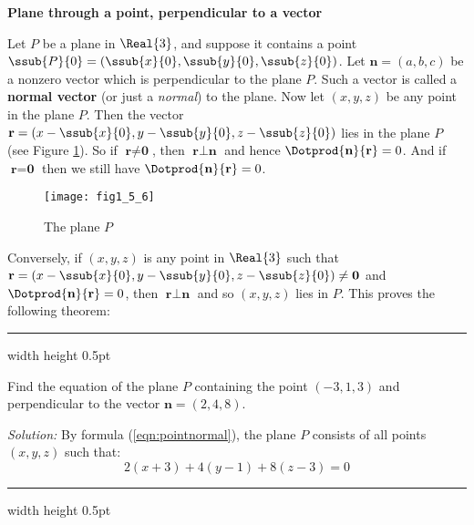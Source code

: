\par\noindent\textbf{\large{Plane through a point, perpendicular to a vector}}\normalsize\vspace{1.5mm}

Let $P$ be a plane in $\Real{3}$, and suppose it contains a point
$\ssub{P}{0} = (\ssub{x}{0},\ssub{y}{0},\ssub{z}{0})$. Let $\textbf{n} = (a,b,c)$ be a nonzero vector which is
perpendicular to the plane $P$. Such a vector is called a \textbf{normal vector} (or just a \emph{normal}) to the plane.
 Now let $(x,y,z)$ be any point in the plane $P$. Then the vector
$\textbf{r} = (x - \ssub{x}{0},y - \ssub{y}{0},z - \ssub{z}{0})$ lies in the plane $P$ (see Figure \ref{fig:planenorm}).
So if $\textbf{r} \ne \textbf{0}$, then $\textbf{r} \perp \textbf{n}$ and hence $\Dotprod{\textbf{n}}{\textbf{r}} = 0$.
And if $\textbf{r} = \textbf{0}$ then we still have $\Dotprod{\textbf{n}}{\textbf{r}} = 0$.

\begin{figure}[h]
 \begin{center}
  \texttt{[image: fig1\_5\_6]}
 \end{center}\vspace{-5mm}
 \caption[]{\quad The plane $P$}
 \label{fig:planenorm}
\end{figure}

Conversely, if $(x,y,z)$ is any point in $\Real{3}$ such that $\textbf{r} = (x - \ssub{x}{0},y - \ssub{y}{0},z -
\ssub{z}{0}) \ne \textbf{0}$ and $\Dotprod{\textbf{n}}{\textbf{r}} = 0$, then $\textbf{r} \perp \textbf{n}$ and
so $(x,y,z)$ lies in $P$. This proves the following theorem:

\hrule width \textwidth height 0.5pt
\begin{exmp}\label{exmp:pointnormal}
 Find the equation of the plane $P$ containing the point $(-3,1,3)$ and perpendicular to the vector $\textbf{n} =
 (2,4,8)$.\vspace{1mm}
 \par\noindent\emph{Solution:} By formula (\ref{eqn:pointnormal}), the plane $P$ consists of all points $(x,y,z)$ such
 that:
 \begin{displaymath}
  2(x + 3) + 4(y - 1) + 8(z - 3) = 0
 \end{displaymath}
\end{exmp}
\hrule width \textwidth height 0.5pt
\vspace{2mm}

